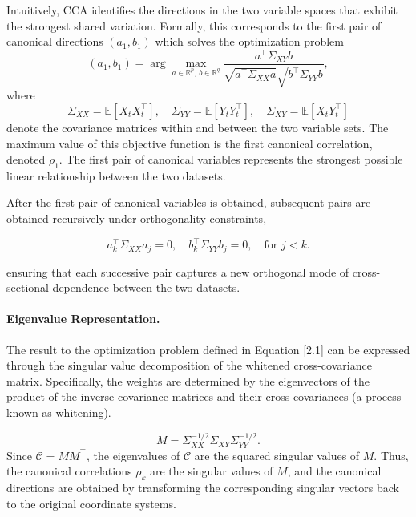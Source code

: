 \documentclass[12pt]{report} %
\begin{document}
Intuitively, CCA identifies the directions in the two variable spaces that exhibit the strongest 
shared variation. Formally, this corresponds to the first pair of canonical directions
$(a_1, b_1)$ which solves the optimization problem
\begin{equation}
(a_1, b_1) 
= \arg\max_{a \in \mathbb{R}^p,\, b \in \mathbb{R}^q}
\frac{a^\top \Sigma_{XY} b}
{\sqrt{a^\top \Sigma_{XX} a} \sqrt{b^\top \Sigma_{YY} b}},
\end{equation}
where
\[
\Sigma_{XX} = \mathbb{E}[X_t X_t^\top], 
\quad
\Sigma_{YY} = \mathbb{E}[Y_t Y_t^\top], 
\quad
\Sigma_{XY} = \mathbb{E}[X_t Y_t^\top]
\]
denote the covariance matrices within and between the two variable sets. The maximum 
value of this objective function is the first canonical correlation, denoted $\rho_1$. 
The first pair of canonical variables represents the strongest possible linear 
relationship between the two datasets. 

After the first pair of canonical variables is obtained, subsequent pairs are obtained recursively 
under orthogonality constraints, 

\begin{equation}
a_k^\top \Sigma_{XX} a_j = 0, 
\quad 
b_k^\top \Sigma_{YY} b_j = 0,
\quad \text{for } j < k.
\end{equation}

ensuring that each successive pair captures a new orthogonal mode of cross-sectional 
dependence between the two datasets. 

\paragraph{Eigenvalue Representation.}

The result to the optimization problem defined in Equation [2.1] can be 
expressed through the singular value decomposition of the 
whitened cross-covariance matrix.  Specifically, the weights are 
determined by the eigenvectors of the product of the inverse covariance matrices and 
their cross-covariances (a process known as whitening).

\[
M =
\Sigma_{XX}^{-1/2}
\Sigma_{XY}
\Sigma_{YY}^{-1/2}.
\]
Since $\mathcal{C} = MM^\top$,
the eigenvalues of \(\mathcal{C}\) are the squared singular values of \(M\).
Thus, the canonical correlations \(\rho_k\) are the singular values of \(M\),
and the canonical directions are obtained by transforming the corresponding
singular vectors back to the original coordinate systems.
\end{document}
